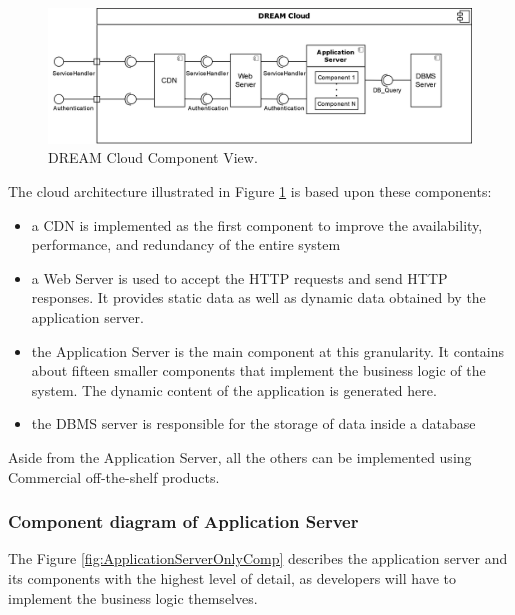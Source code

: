\begin{figure}[hbt!]
\centering
\includegraphics[width=\textwidth]{../images_diagrams/dd/component_only_cloud.png}
\caption{DREAM Cloud Component View.}
\label{fig:CloudOnlyComp}
\end{figure}

The cloud architecture illustrated in Figure \ref{fig:CloudOnlyComp} is based upon these components:
\begin{itemize}
	\item a CDN is implemented as the first component to improve the availability, performance, and redundancy of the entire system
	\item a Web Server is used to accept the HTTP requests and send HTTP responses. It provides static data as well as dynamic data obtained by the application server.
	\item the Application Server is the main component at this granularity. It contains about fifteen smaller components that implement the business logic of the system. The dynamic content of the application is generated here.
	\item the DBMS server is responsible for the storage of data inside a database
\end{itemize}
Aside from the Application Server, all the others can be implemented using Commercial off-the-shelf products. \\

\subsubsection{Component diagram of Application Server}

The Figure \ref{fig:ApplicationServerOnlyComp} describes the application server and its components with the highest level of detail, as developers will have to implement the business logic themselves.\\

